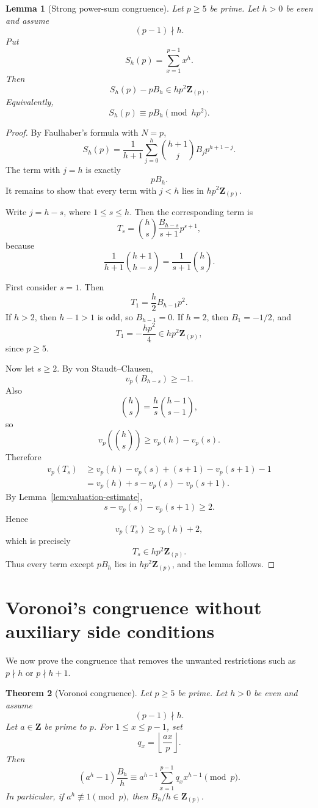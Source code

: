 \documentclass[11pt]{article}
\newtheorem{theorem}{Theorem}[section]
\newtheorem{lemma}[theorem]{Lemma}
\newcommand{\Z}{\mathbf Z}
\newcommand{\Bern}{B}
\newcommand{\floor}[1]{\left\lfloor #1\right\rfloor}
\begin{document}
\begin{lemma}[Strong power-sum congruence]\label{lem:power-sum-strong}
Let $p\ge5$ be prime.  Let $h>0$ be even and assume
\[
  (p-1)\nmid h.
\]
Put
\[
  S_h(p)=\sum_{x=1}^{p-1}x^h.
\]
Then
\[
  S_h(p)-p\Bern_h\in h p^2\Z_{(p)}.
\]
Equivalently,
\[
  S_h(p)\equiv p\Bern_h\pmod {h p^2}.
\]
\end{lemma}

\begin{proof}
By Faulhaber's formula with $N=p$,
\[
  S_h(p)
  =
  \frac{1}{h+1}
  \sum_{j=0}^{h}{h+1\choose j}\Bern_j p^{h+1-j}.
\]
The term with $j=h$ is exactly
\[
  p\Bern_h.
\]
It remains to show that every term with $j<h$ lies in $h p^2\Z_{(p)}$.

Write $j=h-s$, where $1\le s\le h$.  Then the corresponding term is
\[
  T_s
  =
  {h\choose s}\frac{\Bern_{h-s}}{s+1}p^{s+1},
\]
because
\[
  \frac{1}{h+1}{h+1\choose h-s}
  =
  \frac{1}{s+1}{h\choose s}.
\]

First consider $s=1$.  Then
\[
  T_1=\frac{h}{2}\Bern_{h-1}p^2.
\]
If $h>2$, then $h-1>1$ is odd, so $\Bern_{h-1}=0$.
If $h=2$, then $\Bern_{1}=-1/2$, and
\[
  T_1=-\frac{h p^2}{4}\in h p^2\Z_{(p)},
\]
since $p\ge5$.

Now let $s\ge2$.  By von Staudt--Clausen,
\[
  v_p(\Bern_{h-s})\ge -1.
\]
Also
\[
  {h\choose s}=\frac{h}{s}{h-1\choose s-1},
\]
so
\[
  v_p\left({h\choose s}\right)
  \ge v_p(h)-v_p(s).
\]
Therefore
\[
\begin{aligned}
  v_p(T_s)
  &\ge
  v_p(h)-v_p(s)+(s+1)-v_p(s+1)-1 \\
  &=
  v_p(h)+s-v_p(s)-v_p(s+1).
\end{aligned}
\]
By Lemma~\ref{lem:valuation-estimate},
\[
  s-v_p(s)-v_p(s+1)\ge2.
\]
Hence
\[
  v_p(T_s)\ge v_p(h)+2,
\]
which is precisely
\[
  T_s\in h p^2\Z_{(p)}.
\]
Thus every term except $p\Bern_h$ lies in $hp^2\Z_{(p)}$, and the lemma follows.
\end{proof}

\section{Voronoi's congruence without auxiliary side conditions}

We now prove the congruence that removes the unwanted restrictions such as
$p\nmid h$ or $p\nmid h+1$.

\begin{theorem}[Voronoi congruence]\label{thm:voronoi}
Let $p\ge5$ be prime.  Let $h>0$ be even and assume
\[
  (p-1)\nmid h.
\]
Let $a\in\Z$ be prime to $p$.  For $1\le x\le p-1$, set
\[
  q_x=\floor{\frac{a x}{p}}.
\]
Then
\[
  \boxed{
  (a^h-1)\frac{\Bern_h}{h}
  \equiv
  a^{h-1}\sum_{x=1}^{p-1}q_x x^{h-1}
  \pmod p.}
\]
In particular, if $a^h\not\equiv1\pmod p$, then $\Bern_h/h\in\Z_{(p)}$.
\end{theorem}
\end{document}
